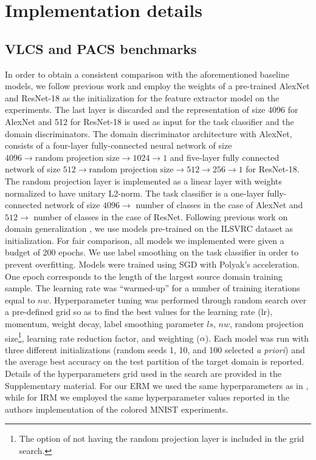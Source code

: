 \documentclass{article}
\begin{document}
\section{Implementation details}
\subsection{VLCS and PACS benchmarks}
In order to obtain a consistent comparison with the aforementioned baseline models, we follow previous work and employ the weights of a pre-trained AlexNet \cite{krizhevsky2012imagenet} and ResNet-18 \cite{he2016deep}  as the initialization for the feature extractor model on the experiments. \iffalse  with both benchmarks \fi The last layer is discarded and the representation of size 4096 for AlexNet and 512 for ResNet-18 is used as input for the task classifier and the domain discriminators. The domain discriminator architecture with AlexNet, consists of a four-layer fully-connected neural network of size $4096 \rightarrow \text{random projection size} \rightarrow 1024 \rightarrow 1$ and five-layer fully connected network of size $512 \rightarrow \text{random projection size} \rightarrow 512 \rightarrow 256 \rightarrow 1 $ for ResNet-18. The random projection layer is implemented as a linear layer with weights normalized to have unitary L2-norm. The task classifier is a one-layer fully-connected network of size $4096 \rightarrow$ number of classes in the case of AlexNet and $512 \rightarrow$ number of classes in the case of ResNet.
Following previous work on domain generalization \cite{li2017deeper, li2019episodic}, we use models pre-trained on the ILSVRC dataset \cite{ILSVRC15} as initialization. For fair comparison, all models we implemented were given a budget of 200 epochs. We use label smoothing \cite{szegedy2016rethinking} on the task classifier in order to prevent overfitting. Models were trained using SGD with Polyak's acceleration. One epoch corresponds to the length of the largest source domain training sample. The learning rate was ``warmed-up'' for a number of training iterations equal to $nw$. Hyperparameter tuning was performed through random search over a pre-defined grid so as to find the best values for the learning rate (lr), momentum, weight decay, label smoothing parameter $ls$, $nw$, random projection size\footnote{The option of not having the random projection layer is included in the grid search.},
learning rate reduction factor, and weighting ($\alpha$). Each model was run with three different initializations (random seeds 1, 10, and 100 selected \textit{a priori}) and the average best accuracy on the test partition of the target domain is reported. Details of the hyperparameters grid used in the search are provided in the Supplementary material. For our ERM we used the same hyperparameters as in \cite{carlucci2019domain}, while for IRM we employed the same hyperparameter values reported in the authors implementation of the colored MNIST experiments.
\end{document}
